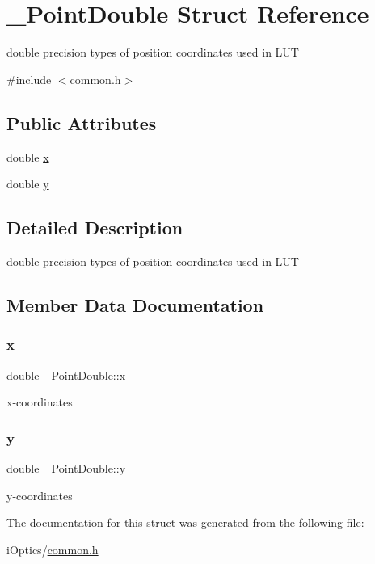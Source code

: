 \hypertarget{struct___point_double}{}\section{\+\_\+\+Point\+Double Struct Reference}
\label{struct___point_double}


double precision types of position coordinates used in L\+UT  




{\ttfamily \#include $<$common.\+h$>$}

\subsection*{Public Attributes}
\begin{DoxyCompactItemize}
\item 
double \mbox{\hyperlink{struct___point_double_aa250ab1da28280804dba8c1116e0586f}{x}}
\item 
double \mbox{\hyperlink{struct___point_double_ab9150c29d5a2399ef62b28b7a8b01ea1}{y}}
\end{DoxyCompactItemize}


\subsection{Detailed Description}
double precision types of position coordinates used in L\+UT 

\subsection{Member Data Documentation}
\mbox{\label{struct___point_double_aa250ab1da28280804dba8c1116e0586f}} 
\subsubsection{\texorpdfstring{x}{x}}
{\footnotesize\ttfamily double \+\_\+\+Point\+Double\+::x}

x-\/coordinates \mbox{\label{struct___point_double_ab9150c29d5a2399ef62b28b7a8b01ea1}} 
\subsubsection{\texorpdfstring{y}{y}}
{\footnotesize\ttfamily double \+\_\+\+Point\+Double\+::y}

y-\/coordinates 

The documentation for this struct was generated from the following file\+:\begin{DoxyCompactItemize}
\item 
i\+Optics/\mbox{\hyperlink{common_8h}{common.\+h}}\end{DoxyCompactItemize}
